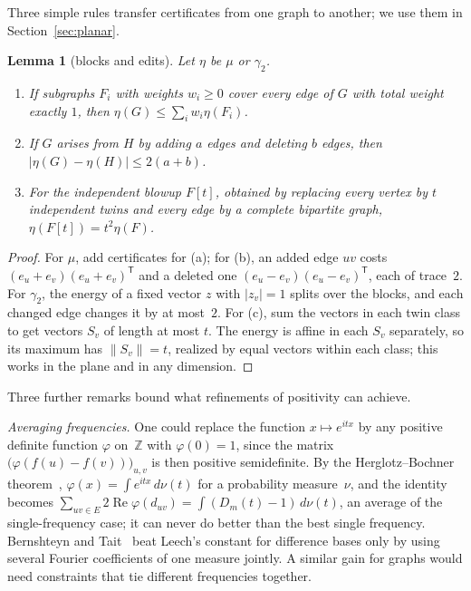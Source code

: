 \documentclass[11pt]{amsart}
\newcommand{\thmmarker}{}
\newcommand{\mgpt}{\gdef\thmmarker{\textsuperscript{$\dagger$}}}
\theoremstyle{tplain}
\newtheorem{lemma}[theorem]{Lemma}
\theoremstyle{tdefinition}
\theoremstyle{tremark}
\newcommand{\ZZ}{\mathbb Z}
\begin{document}
Three simple rules transfer certificates from one graph to another; we use
them in Section~\ref{sec:planar}.

\mgpt\begin{lemma}[blocks and edits]\label{lem:blocks}
Let $\eta$ be $\mu$ or $\gamma_2$.
\begin{enumerate}[label=(\alph*)]
\item If subgraphs $F_i$ with weights $w_i\ge0$ cover every edge of $G$ with
  total weight exactly $1$, then $\eta(G)\le\sum_iw_i\eta(F_i)$.
\item If $G$ arises from $H$ by adding $a$ edges and deleting $b$ edges, then
    $|\eta(G)-\eta(H)|\le2(a+b)$.
\item For the independent blowup $F[t]$, obtained by replacing every vertex
  by $t$ independent twins and every edge by a complete bipartite graph,
  $\eta(F[t])=t^2\eta(F)$.
\end{enumerate}
\end{lemma}

\begin{proof}
For $\mu$, add certificates for (a); for (b), an added edge $uv$ costs
$(e_u+e_v)(e_u+e_v)^{\mathsf T}$ and a deleted one
$(e_u-e_v)(e_u-e_v)^{\mathsf T}$, each of trace~$2$. For $\gamma_2$, the energy of a fixed vector $z$ with $|z_v|=1$ splits over
the blocks, and each changed edge changes
it by at most~$2$. For (c), sum the vectors in each twin class to get vectors
$S_v$ of length at most $t$. The energy is affine in each $S_v$ separately, so
its maximum has $\|S_v\|=t$, realized by equal vectors within each class;
this works in the plane and in any dimension.
\end{proof}

Three further remarks bound what refinements of positivity can achieve.

\emph{Averaging frequencies.} One could replace the function $x\mapsto e^{itx}$ by any
positive definite function $\varphi$ on~$\ZZ$ with $\varphi(0)=1$, since the matrix
$\bigl(\varphi(f(u)-f(v))\bigr)_{u,v}$ is then positive semidefinite. By
the Herglotz--Bochner theorem~\cite{rudin}, $\varphi(x)=\int e^{itx}\,d\nu(t)$ for a probability measure~$\nu$, and the identity becomes
$\sum_{uv\in E}2\operatorname{Re}\varphi(d_{uv})=\int(D_m(t)-1)\,d\nu(t)$, an
average of the single-frequency case; it can never do better than the best
single frequency. Bernshteyn and Tait~\cite{bt} beat Leech's constant for
difference bases only by using several Fourier coefficients of one measure
jointly. A similar gain for graphs would need constraints that tie different
frequencies together.
\end{document}
